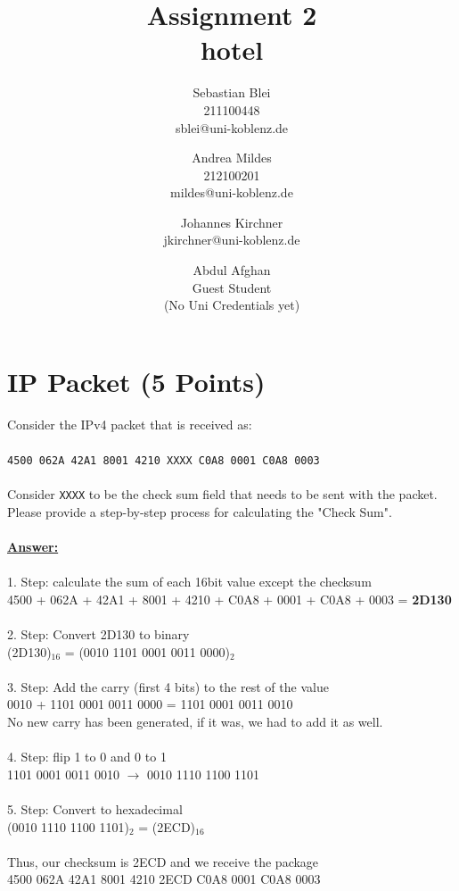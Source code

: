 \documentclass{scrartcl}
\author{%
  Sebastian Blei \\ \normalsize{211100448} \\{\normalsize sblei@uni-koblenz.de} \and
  Andrea Mildes \\ \normalsize{212100201} \\{\normalsize mildes@uni-koblenz.de} \and
  Johannes Kirchner \\ \normalsize{jkirchner@uni-koblenz.de} \and
  Abdul Afghan \\ \normalsize{Guest Student} \\ \normalsize(No Uni Credentials yet)
}
\title{Assignment 2 \\ hotel}
\date{}
\begin{document}
\maketitle



\section{IP Packet (5 Points)}

Consider the IPv4 packet that is received as:\\ \\
\texttt{4500 062A 42A1 8001 4210 XXXX C0A8 0001 C0A8 0003}\\ \\ 
Consider \texttt{XXXX} to be the check sum field that needs to be sent with the packet.\\
Please provide a step-by-step process for calculating the "Check Sum".\\ \\ 
\textbf{\underline{Answer:}}\\
\\
1. Step: calculate the sum of each 16bit value except the checksum\\
4500 + 062A + 42A1 + 8001 + 4210 + C0A8 + 0001 + C0A8 + 0003 = \textbf{2D130}\\
\\
2. Step: Convert 2D130 to binary\\
(2D130)$_{16}$ = (0010 1101 0001 0011 0000)$_{2}$\\
\\
3. Step: Add the carry (first 4 bits) to the rest of the value\\
0010 + 1101 0001 0011 0000 = 1101 0001 0011 0010\\
No new carry has been generated, if it was, we had to add it as well.\\
\\
4. Step: flip 1 to 0 and 0 to 1\\
1101 0001 0011 0010 $\rightarrow$ 0010 1110 1100 1101\\
\\
5. Step: Convert to hexadecimal\\
(0010 1110 1100 1101)$_{2}$ = (2ECD)$_{16}$\\
\\
Thus, our checksum is 2ECD and we receive the package\\
4500 062A 42A1 8001 4210 2ECD C0A8 0001 C0A8 0003
\end{document}
